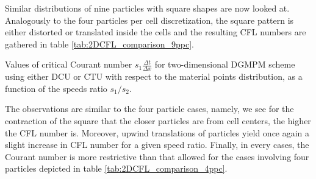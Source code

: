 Similar distributions of nine particles with square shapes are now looked at.
Analogously to the four particles per cell discretization, the square pattern is either distorted or translated inside the cells and the resulting CFL numbers are gathered in table \ref{tab:2DCFL_comparison_9ppc}.
\begin{table}[h!]
  \centering
  
  \caption{Values of critical Courant number $s_1\frac{\Delta t}{\Delta x}$ for two-dimensional DGMPM scheme using either DCU or CTU with respect to the material points distribution, as a function of the speeds ratio $s_1/s_2$.}
  \label{tab:2DCFL_comparison_9ppc}
\end{table}
The observations are similar to the four particle cases, namely, we see for the contraction of the square that the closer particles are from cell centers, the higher the CFL number is.
Moreover, upwind translations of particles yield once again a slight increase in CFL number for a given speed ratio.
Finally, in every cases, the Courant number is more restrictive than that allowed for the cases involving four particles depicted in table \ref{tab:2DCFL_comparison_4ppc}.
